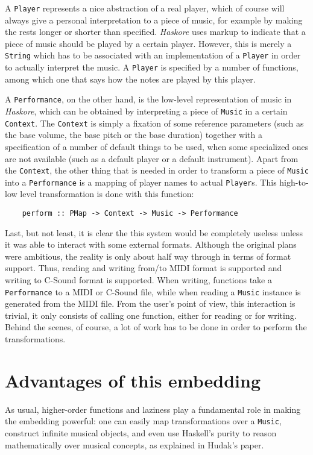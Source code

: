 \documentclass[a4paper,10pt]{article}
\begin{document}
A {\tt Player} represents a nice abstraction of a real player, which of course will
always give a personal interpretation to a piece of music, for example by making
the rests longer or shorter than specified. \emph{Haskore} uses markup to indicate
that a piece of music should be played by a certain player. However, this is
merely a {\tt String} which has to be associated with an implementation of a
{\tt Player} in order to actually interpret the music. A {\tt Player} is specified
by a number of functions, among which one that says how the notes are played
by this player.

A {\tt Performance}, on the other hand, is the low-level representation of music
in \emph{Haskore}, which can be obtained by interpreting a piece of {\tt Music} in a certain
{\tt Context}. The {\tt Context} is simply a fixation of some reference parameters
(such as the base volume, the base pitch or the base duration) together with a
specification of a number of default things to be used, when some specialized
ones are not available (such as a default player or a default instrument). Apart from
the {\tt Context}, the other thing that is needed in order to transform a piece of
{\tt Music} into a {\tt Performance} is a mapping of player names to actual {\tt Player}s.
This high-to-low level transformation is done with this function:

\begin{verbatim}
    perform :: PMap -> Context -> Music -> Performance
\end{verbatim}

Last, but not least, it is clear the this system would be completely useless unless it
was able to interact with some external formats. Although the original plans were
ambitious, the reality is only about half way through in terms of format support. Thus,
reading and writing from/to MIDI format is supported and writing to C-Sound format
is supported. When writing, functions take a {\tt Performance} to a MIDI or C-Sound
file, while when reading a {\tt Music} instance is generated from the MIDI file. From
the user's point of view, this interaction is trivial, it only consists of calling one function,
either for reading or for writing. Behind the scenes, of course, a lot of work has to be
done in order to perform the transformations.

\section{Advantages of this embedding}
As usual, higher-order functions and laziness play a fundamental
role in making the embedding powerful: one can easily map
transformations over a {\tt Music}, construct infinite musical
objects, and even use Haskell's purity to reason mathematically
over musical concepts, as explained in Hudak's paper.
\end{document}
